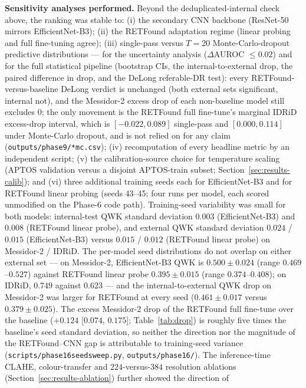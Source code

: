 \documentclass[journal]{IEEEtran}
\renewcommand{\_}{\origunderscore\allowbreak}
\begin{document}
\textbf{Sensitivity analyses performed.} Beyond the deduplicated-internal check
above, the ranking was stable to: (i) the secondary CNN backbone (ResNet-50
mirrors EfficientNet-B3); (ii) the RETFound adaptation regime (linear probing and
full fine-tuning agree); (iii) single-pass versus $T=20$ Monte-Carlo-dropout
predictive distributions --- for the uncertainty analysis ($\Delta$AUROC
$\leq 0.02$) and for the full statistical pipeline (bootstrap CIs, the
internal-to-external drop, the paired difference in drop, and the DeLong
referable-DR test): every RETFound-versus-baseline DeLong verdict is unchanged
(both external sets significant, internal not), and the Messidor-2 excess drop of
each non-baseline model still excludes $0$; the only movement is the RETFound
full fine-tune's marginal IDRiD excess-drop interval, which is
$[-0.022, 0.089]$ single-pass and $[0.000, 0.114]$ under Monte-Carlo dropout, and
is not relied on for any claim (\texttt{outputs/\allowbreak{}phase9/\allowbreak{}*\_mc.csv});
(iv) recomputation of every headline metric by an independent script; (v) the
calibration-source choice for temperature scaling (APTOS validation versus a
disjoint APTOS-train subset; Section~\ref{sec:results-calib}); and (vi) three
additional training seeds each for EfficientNet-B3 and for RETFound linear
probing (seeds 43--45; four runs per model, each scored unmodified on the
Phase-6 code path). Training-seed variability was small for both models:
internal-test QWK standard deviation $0.003$ (EfficientNet-B3) and $0.008$
(RETFound linear probe), and external QWK standard deviation $0.024$ / $0.015$
(EfficientNet-B3) versus $0.015$ / $0.012$ (RETFound linear probe) on
Messidor-2 / IDRiD. The per-model seed distributions do not overlap on either
external set --- on Messidor-2, EfficientNet-B3 QWK is $0.500 \pm 0.024$
(range $0.469$--$0.527$) against RETFound linear probe $0.395 \pm 0.015$
(range $0.374$--$0.408$); on IDRiD, $0.749$ against $0.623$ --- and the
internal-to-external QWK drop on Messidor-2 was larger for RETFound at every
seed ($0.461 \pm 0.017$ versus $0.379 \pm 0.025$). The excess Messidor-2 drop
of the RETFound full fine-tune over the baseline ($+0.124$ [$0.074$, $0.175$];
Table~\ref{tab:drop}) is roughly five times the baseline's seed standard
deviation, so neither the direction nor the magnitude of the RETFound--CNN gap
is attributable to training-seed variance
(\texttt{scripts/\allowbreak{}phase16\_seed\_sweep.py}, \texttt{outputs/\allowbreak{}phase16/\allowbreak{}}). The
inference-time CLAHE, colour-transfer and $224$-versus-$384$ resolution
ablations (Section~\ref{sec:results-ablation}) further showed the direction of
\end{document}
